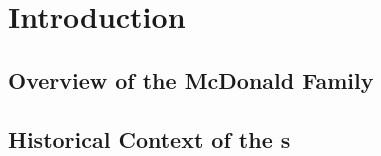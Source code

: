\chapter{Introduction}
\label{introduction}

\section{Overview of the McDonald Family}
\label{sec: overview}

\lipsum[1-2]

\section{Historical Context of the \settler s}
\label{sec: settlers}
\lipsum[1-2s1]